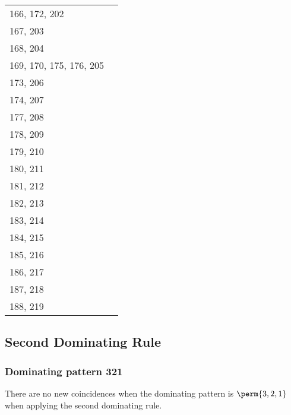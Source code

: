 \begin{center}
\begin{longtabu}[c]{|X|X|}
    166, 172, 202&\\
    167, 203&\\
    168, 204&\\
    169, 170, 175, 176, 205&\\
    173, 206&\\
    174, 207&\\
    177, 208&\\
    178, 209&\\
    179, 210&\\
    180, 211&\\
    181, 212&\\
    182, 213&\\
    183, 214&\\
    184, 215&\\
    185, 216&\\
    186, 217&\\
    187, 218&\\
    188, 219&\\
\hline
\end{longtabu}
\end{center}

\subsection{Second Dominating Rule}
\subsubsection{Dominating pattern 321}
There are no new coincidences when the dominating pattern is \(\perm{3,2,1}\)
when applying the second dominating rule.
